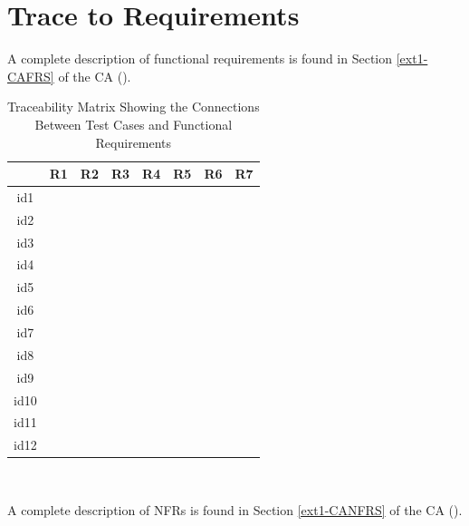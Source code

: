\documentclass[12pt, titlepage]{article}
\begin{document}
\section{Trace to Requirements}
\label{traceabilitytoreq}

A complete description of functional requirements is found in Section \ref{ext1-CAFRS} of the CA (\citet{LBM_CA_PM}).

\begin{table}[!h]
	\begin{center}
		\begin{tabular}{| c | c | c | c | c | c | c | c |}
			\hline
			& R1 & R2 & R3 & R4 & R5 & R6 & R7\\
			\hline
			id1 & \checkmark &\checkmark & \checkmark& \checkmark& \checkmark& &\\
			\hline
			id2 & \checkmark &\checkmark & \checkmark& \checkmark& \checkmark& \checkmark&\\
			\hline
			id3 & \checkmark & & & & & & \\
			\hline
			id4 & \checkmark &\checkmark &\checkmark & & & & \\
			\hline
			id5 & \checkmark &\checkmark &\checkmark & & & & \\
			\hline
			id6 & \checkmark &\checkmark &\checkmark & & & & \\
			\hline
			id7 & \checkmark & & \checkmark& & & & \\
			\hline
			id8 & \checkmark &\checkmark & \checkmark& \checkmark & \checkmark& & \\
			\hline
			id9 & & \checkmark& & \checkmark& \checkmark& & \\
			\hline
			id10 & \checkmark & \checkmark& \checkmark& \checkmark& & & \\
			\hline
			id11 & \checkmark & \checkmark& \checkmark&\checkmark & \checkmark& \checkmark& \\
			\hline
			id12 & & \checkmark & & \checkmark& \checkmark& & \\
			\hline
		\end{tabular}
		\caption{Traceability Matrix Showing the Connections Between Test Cases and Functional Requirements}
		\label{Table:TRCFR}
	\end{center}
\end{table}   

~\newpage

A complete description of NFRs is found in Section \ref{ext1-CANFRS} of the CA (\citet{LBM_CA_PM}).
\end{document}
